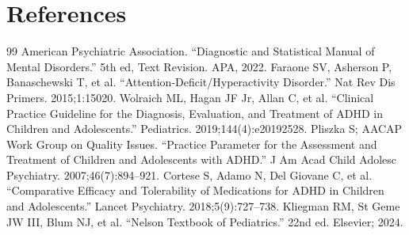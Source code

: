 \section*{References}
\begin{thebibliography}{99}
 American Psychiatric Association. ``Diagnostic and Statistical Manual of Mental Disorders.'' 5th ed, Text Revision. APA, 2022.
 Faraone SV, Asherson P, Banaschewski T, et al. ``Attention-Deficit/Hyperactivity Disorder.'' Nat Rev Dis Primers. 2015;1:15020.
 Wolraich ML, Hagan JF Jr, Allan C, et al. ``Clinical Practice Guideline for the Diagnosis, Evaluation, and Treatment of ADHD in Children and Adolescents.'' Pediatrics. 2019;144(4):e20192528.
 Pliszka S; AACAP Work Group on Quality Issues. ``Practice Parameter for the Assessment and Treatment of Children and Adolescents with ADHD.'' J Am Acad Child Adolesc Psychiatry. 2007;46(7):894--921.
 Cortese S, Adamo N, Del Giovane C, et al. ``Comparative Efficacy and Tolerability of Medications for ADHD in Children and Adolescents.'' Lancet Psychiatry. 2018;5(9):727--738.
 Kliegman RM, St Geme JW III, Blum NJ, et al. ``Nelson Textbook of Pediatrics.'' 22nd ed. Elsevier; 2024.
\end{thebibliography}
